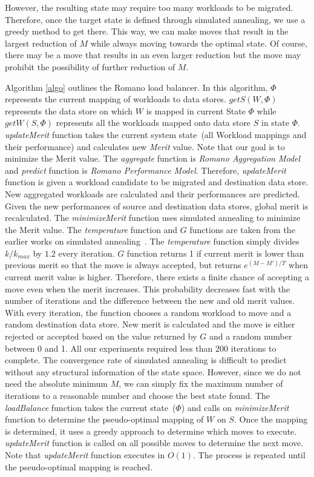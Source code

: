 However, the resulting state may require too many workloads to be migrated.
Therefore, once the target state is defined through simulated annealing, we use a greedy method to get there.
This way, we can make moves that result in the largest reduction of $M$ while always moving towards the optimal state.
Of course, there may be a move that results in an even larger reduction but the move may prohibit the possibility of further reduction of $M$.

Algorithm \ref{algo} outlines the Romano load balancer.
In this algorithm, $\Phi$ represents the current mapping of workloads to data stores.
$getS(W, \Phi)$ represents the data store on which $W$ is mapped in current State $\Phi$ while $getW(S, \Phi)$ represents all the workloads mapped onto data store $S$ in state $\Phi$.
\emph{updateMerit} function takes the current system state~(all Workload mappings and their performance) and calculates new \emph{Merit} value.
Note that our goal is to minimize the Merit value.
The \emph{aggregate} function is \emph{Romano Aggregation Model} and \emph{predict} function is \emph{Romano Performance Model}.
Therefore, \emph{updateMerit} function is given a workload candidate to be migrated and destination data store.
New aggregated workloads are calculated and their performances are predicted.
Given the new performances of source and destination data stores, global merit is recalculated.
The \emph{minimizeMerit} function uses simulated annealing to minimize the Merit value.
The \emph{temperature} function and $G$ functions are taken from the earlier works on simulated annealing~\cite{kirkpatrick:1983}.
The \emph{temperature} function simply divides $k/k_{max}$ by $1.2$ every iteration.
$G$ function returns 1 if current merit is lower than previous merit so that the move is always accepted, but returns $e^{(M-M')/T}$ when current merit value is higher.
Therefore, there exists a finite chance of accepting a move even when the merit increases.
This probability decreases fast with the number of iterations and the difference between the new and old merit values.
With every iteration, the function chooses a random workload to move and a random destination data store.
New merit is calculated and the move is either rejected or accepted based on the value returned by $G$ and a random number between 0 and 1.
All our experiments required less than 200 iterations to complete.
The convergence rate of simulated annealing is difficult to predict without any structural information of the state space.
However, since we do not need the absolute minimum $M$, we can simply fix the maximum number of iterations to a reasonable number and choose the best state found.
The \emph{loadBalance} function takes the current state~($\Phi$) and calls on \emph{minimizeMerit} function to determine the pseudo-optimal mapping of $W$ on $S$.
Once the mapping is determined, it uses a greedy approach to determine which moves to execute. \emph{updateMerit} function is called on all possible moves to determine the next move.
Note that \emph{updateMerit} function executes in $O(1)$.
The process is repeated until the pseudo-optimal mapping is reached.

